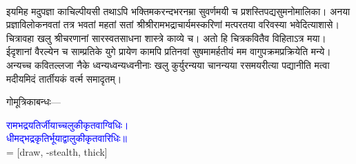 \vspace{4mm}
\fontsize{14}{21}\selectfont
{}\nopagebreak\\
\vspace{4mm}
\fontsize{14}{21}\selectfont
\begin{sloppypar}\justifying\noindent\hspace{10mm} इयमिह मदुपज्ञा काचिल्पीयसी 
तथाऽपि भक्तिमकरन्दभरनम्रा सुवर्णमयी च प्रशस्तिपद्यसुमनोमालिका। अनया प्रज्ञाविलोकनवतां तत्र भवतां महतां सतां श्रीश्रीरामभद्राचार्यमस्करिणां मत्परतया वरिवस्या भवेदित्याशासे। चित्रावहा खलु श्रीचरणानां सारस्वतसाधना शास्त्रे काव्ये च। अतो हि चित्रकवितैव विहिताऽत्र मया। ईदृशानां वैरल्येन च साम्प्रतिके युगे प्रायेण कामपि प्रतिनवां सुषमामर्हतीयं मम वागुपक्रमप्रक्रियेति मन्ये। अन्यच्च कवितल्लजा 
नैके ध्वन्यध्वन्यध्वनीनाः खलु कुर्युरन्यया चानन्यया रसमयरीत्या पद्यानीति मत्वा मदीयमिदं तार्तीयकं वर्त्म समादृतम्।\end{sloppypar}
\begin{sloppypar}\justifying\noindent\hspace{10mm} गोमूत्रिकाबन्धः—\end{sloppypar}
\fontsize{14}{21}\selectfont\centering\textcolor{blue}{रामभद्रयतिर्जीयाच्चलुकीकृतवाग्विधिः।\nopagebreak\\
धीमद्भद्रकृतिर्भूयाद्वालुकीकृतवारिधिः॥}\\
\vspace{4mm}
 = [draw, -stealth, thick]
